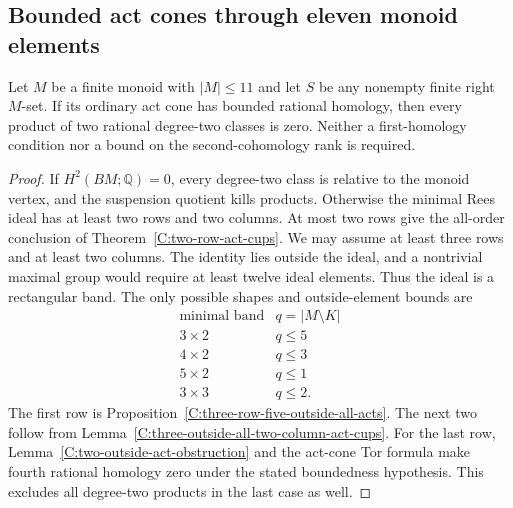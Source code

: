\subsection{Bounded act cones through eleven monoid elements}

\begin{lemma}\label{C:eleven-bounded-all-products}
Let $M$ be a finite monoid with $|M|\leq11$ and let $S$ be
any nonempty finite right $M$-set. If its ordinary act cone
has bounded rational homology, then every product of two
rational degree-two classes is zero. Neither a first-homology
condition nor a bound on the second-cohomology rank is required.
\end{lemma}
\begin{proof}
If $H^2(BM;\mathbb Q)=0$, every degree-two class is relative
to the monoid vertex, and the suspension quotient kills products.
Otherwise the minimal Rees ideal has at least two rows and
two columns. At most two rows give the all-order conclusion
of Theorem~\ref{C:two-row-act-cups}. We may assume at least
three rows and at least two columns. The identity lies outside
the ideal, and a nontrivial maximal group would require at
least twelve ideal elements. Thus the ideal is a rectangular
band. The only possible shapes and outside-element bounds are
\[
\begin{array}{c|c}
 \text{minimal band}&q=|M\setminus K|\\\hline
 3\times2&q\leq5\\
 4\times2&q\leq3\\
 5\times2&q\leq1\\
 3\times3&q\leq2.
\end{array}
\]
The first row is Proposition~\ref{C:three-row-five-outside-all-acts}.
The next two follow from
Lemma~\ref{C:three-outside-all-two-column-act-cups}.
For the last row, Lemma~\ref{C:two-outside-act-obstruction}
and the act-cone Tor formula make fourth rational homology
zero under the stated boundedness hypothesis. This excludes
all degree-two products in the last case as well.
\end{proof}

